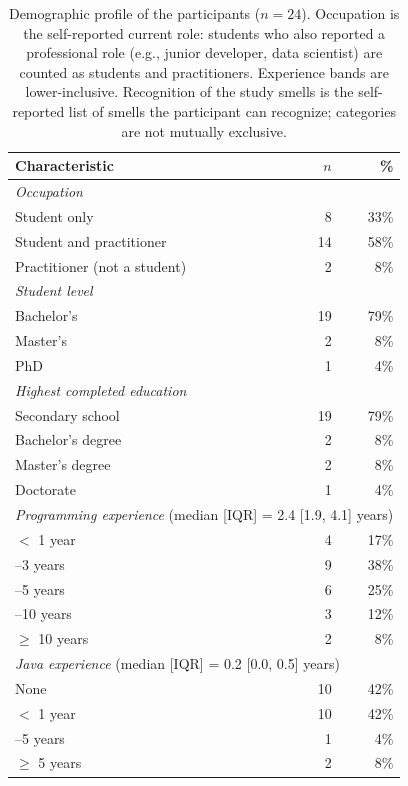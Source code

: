 \begin{table}[ht]
\centering
\caption{Demographic profile of the participants ($n = 24$). Occupation is the self-reported current role:
students who also reported a professional role (e.g., junior developer, data scientist) are counted as students and
practitioners. Experience bands are lower-inclusive. Recognition of the study smells is the self-reported list of
smells the participant can recognize; categories are not mutually exclusive.}
\label{tab:demographics}
\begin{tabular}{lrr}
\toprule
Characteristic & $n$ & \% \\
\midrule
\multicolumn{3}{l}{\textit{Occupation}} \\
\quad Student only & 8 & 33\% \\
\quad Student and practitioner & 14 & 58\% \\
\quad Practitioner (not a student) & 2 & 8\% \\
\midrule
\multicolumn{3}{l}{\textit{Student level}} \\
\quad Bachelor's & 19 & 79\% \\
\quad Master's & 2 & 8\% \\
\quad PhD & 1 & 4\% \\
\midrule
\multicolumn{3}{l}{\textit{Highest completed education}} \\
\quad Secondary school & 19 & 79\% \\
\quad Bachelor's degree & 2 & 8\% \\
\quad Master's degree & 2 & 8\% \\
\quad Doctorate & 1 & 4\% \\
\midrule
\multicolumn{3}{l}{\textit{Programming experience} (median [IQR] = 2.4 [1.9, 4.1] years)} \\
\quad $<$ 1 year & 4 & 17\% \\
\quad 1--3 years & 9 & 38\% \\
\quad 3--5 years & 6 & 25\% \\
\quad 5--10 years & 3 & 12\% \\
\quad $\geq$ 10 years & 2 & 8\% \\
\midrule
\multicolumn{3}{l}{\textit{Java experience} (median [IQR] = 0.2 [0.0, 0.5] years)} \\
\quad None & 10 & 42\% \\
\quad $<$ 1 year & 10 & 42\% \\
\quad 1--5 years & 1 & 4\% \\
\quad $\geq$ 5 years & 2 & 8\% \\

\end{tabular}
\end{table}
